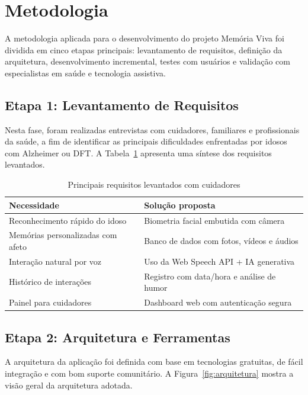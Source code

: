 
\section{Metodologia}

A metodologia aplicada para o desenvolvimento do projeto Memória Viva foi dividida em cinco etapas principais: levantamento de requisitos, definição da arquitetura, desenvolvimento incremental, testes com usuários e validação com especialistas em saúde e tecnologia assistiva.

\subsection{Etapa 1: Levantamento de Requisitos}

Nesta fase, foram realizadas entrevistas com cuidadores, familiares e profissionais da saúde, a fim de identificar as principais dificuldades enfrentadas por idosos com Alzheimer ou DFT. A Tabela~\ref{tab:requisitos} apresenta uma síntese dos requisitos levantados.

\begin{table}[h]
\centering
\caption{Principais requisitos levantados com cuidadores}
\label{tab:requisitos}
\begin{tabular}{|p{5cm}|p{8cm}|}
\hline
\textbf{Necessidade} & \textbf{Solução proposta} \\ \hline
Reconhecimento rápido do idoso & Biometria facial embutida com câmera \\ \hline
Memórias personalizadas com afeto & Banco de dados com fotos, vídeos e áudios \\ \hline
Interação natural por voz & Uso da Web Speech API + IA generativa \\ \hline
Histórico de interações & Registro com data/hora e análise de humor \\ \hline
Painel para cuidadores & Dashboard web com autenticação segura \\ \hline
\end{tabular}
\end{table}

\subsection{Etapa 2: Arquitetura e Ferramentas}

A arquitetura da aplicação foi definida com base em tecnologias gratuitas, de fácil integração e com bom suporte comunitário. A Figura~\ref{fig:arquitetura} mostra a visão geral da arquitetura adotada.


